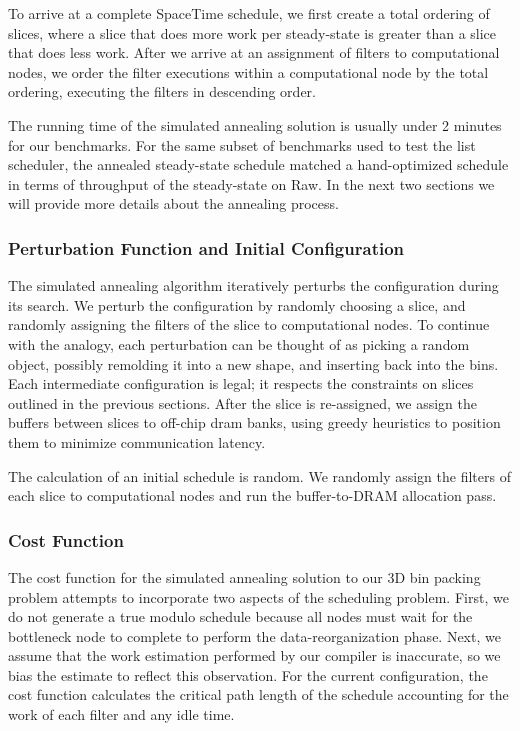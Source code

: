 To arrive at a complete SpaceTime schedule, we first create a total
ordering of slices, where a slice that does more work per steady-state
is greater than a slice that does less work.  After we arrive at an
assignment of filters to computational nodes, we order the filter
executions within a computational node by the total ordering,
executing the filters in descending order.

The running time of the simulated annealing solution is usually under
2 minutes for our benchmarks.  For the same subset of benchmarks used
to test the list scheduler, the annealed steady-state schedule matched
a hand-optimized schedule in terms of throughput of the steady-state
on Raw.  In the next two sections we will provide more details about
the annealing process.

\subsubsection{Perturbation Function and Initial Configuration}
The simulated annealing algorithm iteratively perturbs the
configuration during its search.  We perturb the configuration by
randomly choosing a slice, and randomly assigning the filters of the
slice to computational nodes.  To continue with the analogy, each
perturbation can be thought of as picking a random object, possibly
remolding it into a new shape, and inserting back into the bins. Each
intermediate configuration is legal; it respects the constraints on
slices outlined in the previous sections.  After the slice is
re-assigned, we assign the buffers between slices to off-chip dram
banks, using greedy heuristics to position them to minimize
communication latency.

The calculation of an initial schedule is random.  We randomly assign
the filters of each slice to computational nodes and run the
buffer-to-DRAM allocation pass.  

\subsubsection{Cost Function}
The cost function for the simulated annealing solution to our 3D bin
packing problem attempts to incorporate two aspects of the scheduling
problem.  First, we do not generate a true modulo schedule because all
nodes must wait for the bottleneck node to complete to perform the
data-reorganization phase. Next, we assume that the work estimation
performed by our compiler is inaccurate, so we bias the estimate to
reflect this observation.  For the current configuration, the cost
function calculates the critical path length of the schedule
accounting for the work of each filter and any idle time.

